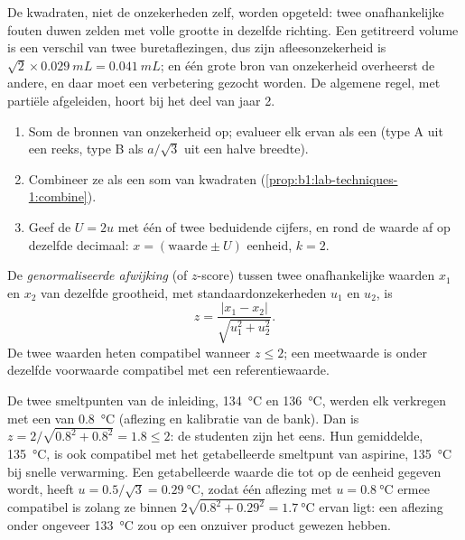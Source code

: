 De kwadraten, niet de onzekerheden zelf, worden opgeteld: twee
onafhankelijke fouten duwen zelden met volle grootte in dezelfde
richting. Een getitreerd volume is een verschil van twee
buretaflezingen, dus zijn afleesonzekerheid is
$\sqrt2 \times \qty{0.029}{mL} = \qty{0.041}{mL}$; en één grote bron van
onzekerheid overheerst de andere, en daar moet een verbetering gezocht
worden. De algemene regel, met partiële afgeleiden, hoort bij het deel van
jaar 2.

\begin{method}\label{met:b1:lab-techniques-1:report-result}
\begin{enumerate}
  \item Som de bronnen van onzekerheid op; evalueer elk ervan als een
         (type A uit een reeks, type B als $a/\sqrt3$
        uit een halve breedte).
  \item Combineer ze als een som van kwadraten (\cref{prop:b1:lab-techniques-1:combine}).
  \item Geef de  $U = 2u$ met één of twee
        beduidende cijfers, en rond de waarde af op dezelfde decimaal:
        $x = (\text{waarde} \pm U)$ eenheid, $k = 2$.
\end{enumerate}
\end{method}

\begin{definition}\label{def:b1:lab-techniques-1:z-score}
De \emph{genormaliseerde afwijking} (of
$z$-score) tussen twee onafhankelijke waarden $x_1$ en $x_2$ van dezelfde
grootheid, met standaardonzekerheden $u_1$ en $u_2$, is
\[
  z = \frac{|x_1 - x_2|}{\sqrt{u_1^2 + u_2^2}} .
\]
De twee waarden heten compatibel wanneer $z \le 2$; een meetwaarde is
onder dezelfde voorwaarde compatibel met een referentiewaarde.
\end{definition}

\begin{example}
De twee smeltpunten van de inleiding, \qty{134}{\celsius} en
\qty{136}{\celsius}, werden elk verkregen met een 
van \qty{0.8}{\celsius} (aflezing en kalibratie van de bank). Dan is
$z = 2/\sqrt{0.8^2 + 0.8^2} = 1.8 \le 2$: de studenten zijn het eens. Hun
gemiddelde, \qty{135}{\celsius}, is ook compatibel met het getabelleerde
smeltpunt van aspirine, \qty{135}{\celsius} bij snelle verwarming. Een
getabelleerde waarde die tot op de eenheid gegeven wordt, heeft
$u = 0.5/\sqrt3 = \qty{0.29}{\celsius}$, zodat één aflezing met
$u = \qty{0.8}{\celsius}$ ermee compatibel is zolang ze binnen
$2\sqrt{0.8^2 + 0.29^2} = \qty{1.7}{\celsius}$ ervan ligt: een aflezing
onder ongeveer \qty{133}{\celsius} zou op een onzuiver product gewezen
hebben.
\end{example}

